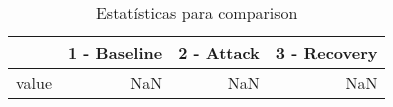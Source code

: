 \begin{table}[htbp]
\caption{Estatísticas para comparison}
\label{tab:comparison_std}
\begin{tabular}{lrrr}
\toprule
 & 1 - Baseline & 2 - Attack & 3 - Recovery \\
\midrule
value & NaN & NaN & NaN \\
\bottomrule
\end{tabular}
\end{table}

